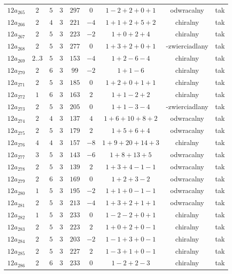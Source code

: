 \begin{longtable}{ccccccccc}
$12a_{265}$ & $2$ & $5$ & $3$ & $297$ & $0$ & $1-2+2+0+1$ & odwracalny & tak \\
$12a_{266}$ & $2$ & $4$ & $3$ & $221$ & $-4$ & $1+1+2+5+2$ & chiralny & tak \\
$12a_{267}$ & $2$ & $5$ & $3$ & $223$ & $-2$ & $1+0+2+4$ & chiralny & tak \\
$12a_{268}$ & $2$ & $5$ & $3$ & $277$ & $0$ & $1+3+2+0+1$ & -zwierciadlany & tak \\
$12a_{269}$ & $2..3$ & $5$ & $3$ & $153$ & $-4$ & $1+2-6-4$ & chiralny & tak \\
$12a_{270}$ & $2$ & $6$ & $3$ & $99$ & $-2$ & $1+1-6$ & chiralny & tak \\
$12a_{271}$ & $2$ & $5$ & $3$ & $185$ & $0$ & $1+2+0+1+1$ & chiralny & tak \\
$12a_{272}$ & $1$ & $6$ & $3$ & $163$ & $2$ & $1+1-2+2$ & chiralny & tak \\
$12a_{273}$ & $2$ & $5$ & $3$ & $205$ & $0$ & $1+1-3-4$ & -zwierciadlany & tak \\
$12a_{274}$ & $2$ & $4$ & $3$ & $137$ & $4$ & $1+6+10+8+2$ & odwracalny & tak \\
$12a_{275}$ & $2$ & $5$ & $3$ & $179$ & $2$ & $1+5+6+4$ & odwracalny & tak \\
$12a_{276}$ & $4$ & $4$ & $3$ & $157$ & $-8$ & $1+9+20+14+3$ & chiralny & tak \\
$12a_{277}$ & $3$ & $5$ & $3$ & $143$ & $-6$ & $1+8+13+5$ & odwracalny & tak \\
$12a_{278}$ & $2$ & $5$ & $3$ & $139$ & $2$ & $1+3+4-1-1$ & odwracalny & tak \\
$12a_{279}$ & $2$ & $6$ & $3$ & $169$ & $0$ & $1+2+3-2$ & odwracalny & tak \\
$12a_{280}$ & $1$ & $5$ & $3$ & $195$ & $-2$ & $1+1+0-1-1$ & odwracalny & tak \\
$12a_{281}$ & $2$ & $5$ & $3$ & $213$ & $-4$ & $1+3+2+1+1$ & odwracalny & tak \\
$12a_{282}$ & $1$ & $5$ & $3$ & $233$ & $0$ & $1-2-2+0+1$ & chiralny & tak \\
$12a_{283}$ & $2$ & $5$ & $3$ & $223$ & $2$ & $1+0+2+0-1$ & chiralny & tak \\
$12a_{284}$ & $2$ & $5$ & $3$ & $203$ & $-2$ & $1-1+3+0-1$ & chiralny & tak \\
$12a_{285}$ & $2$ & $5$ & $3$ & $227$ & $2$ & $1-3+1+0-1$ & chiralny & tak \\
$12a_{286}$ & $2$ & $6$ & $3$ & $233$ & $0$ & $1-2+2-3$ & chiralny & tak \\

\end{longtable}

